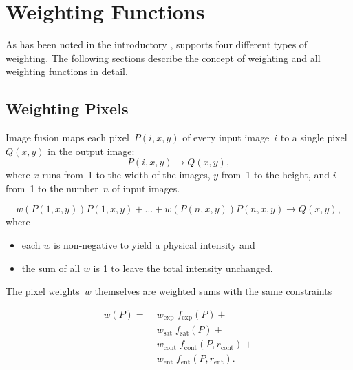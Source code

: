 

\chapter[Weighting Functions]{Weighting Functions
  \label{sec:weighting-functions}
  }

As has been noted in the introductory
, \App{} supports four different
types of weighting.  The following sections describe the concept of
weighting and all weighting functions in detail.


\section[Weighting Pixels]{Weighting Pixels
  \label{sec:weighting-pixels}
  }

Image fusion maps each pixel~$P(i, x, y)$ of every input image~$i$ to
a single pixel~$Q(x, y)$ in the output image:
\[
    P(i, x, y) \rightarrow Q(x, y),
\]
\noindent where $x$ runs from~1 to the width of the images, $y$ from~1
to the height, and $i$ from~1 to the number~$n$ of input images.

\begin{equation}
  \label{equ:weight}
  w(P(1, x, y)) P(1, x, y) + \ldots + w(P(n, x, y)) P(n, x, y)
  \rightarrow
  Q(x, y),
\end{equation}
\noindent where

\begin{itemize}
\item
  each $w$ is non-negative to yield a physical intensity and
\item
  the sum of all $w$ is 1 to leave the total intensity unchanged.
\end{itemize}

\noindent The pixel weights~$w$ themselves are weighted sums with the
same constraints

\begin{align*}
    w(P) = \;
    & w_{\mathrm{exp}} \; f_{\mathrm{exp}}(P) + \\
    & w_{\mathrm{sat}} \; f_{\mathrm{sat}}(P) + \\
    & w_{\mathrm{cont}} \; f_{\mathrm{cont}}(P, r_{\mathrm{cont}}) + \\
    & w_{\mathrm{ent}} \; f_{\mathrm{ent}}(P, r_{\mathrm{ent}}).
\end{align*}

